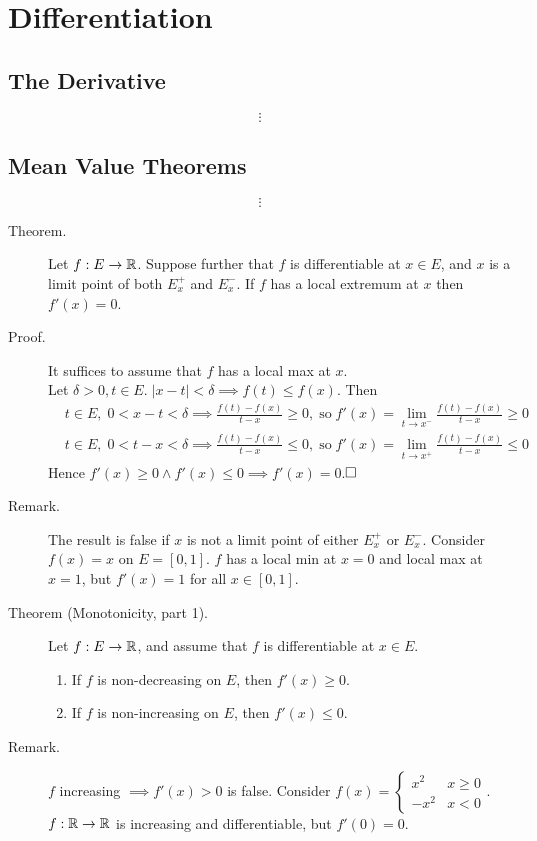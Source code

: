 \documentclass[letterpaper,11pt]{article}
\begin{document}
\section{Differentiation}
\subsection{The Derivative}
\[
\vdots
\]

\subsection{Mean Value Theorems}
\[
\vdots
\]
\begin{description}
\item[Theorem.] Let $f:E\to\mathbb{R}$. Suppose further that
    $f$ is differentiable at $x\in E$,
    and $x$ is a limit point of both $E_x^+$ and $E_x^-$.
    If $f$ has a local extremum at $x$ then $f'(x)=0$.

\item[Proof.] It suffices to assume that $f$ has a local max at $x$.\\
    Let $\delta>0,t\in E.\; |x-t|<\delta\implies f(t)\le f(x)$. Then
    \begin{align*}
    &t\in E,\;0<x-t<\delta\implies\frac{f(t)-f(x)}{t-x}\ge0,\;\text{so}\;
      f'(x)=\lim_{t\to x^-}\frac{f(t)-f(x)}{t-x}\ge 0\\
    &t\in E,\;0<t-x<\delta\implies\frac{f(t)-f(x)}{t-x}\le0,\;\text{so}\;
      f'(x)=\lim_{t\to x^+}\frac{f(t)-f(x)}{t-x}\le0
    \end{align*}
    Hence $f'(x)\ge0\wedge f'(x)\le0\implies f'(x)=0$.$\hfill\square$

\item[Remark.] The result is false if $x$ is not a limit point of
    either $E_x^+$ or $E_x^-$. Consider $f(x)=x$ on $E=[0,1]$.
    $f$ has a local min at $x=0$ and local max at $x=1$, but
    $f'(x)=1$ for all $x\in[0,1]$.

\item[Theorem (Monotonicity, part 1).] Let $f:E\to\mathbb{R}$, and assume
    that $f$ is differentiable at $x\in E$.
    \begin{enumerate}[1)]
    \item If $f$ is non-decreasing on $E$, then $f'(x)\ge0$.
    \item If $f$ is non-increasing on $E$, then $f'(x)\le0$.
    \end{enumerate}

\item[Remark.] $f$ increasing $\implies f'(x)>0$ is false.
    Consider $f(x)=\begin{cases}
      x^2 & x\ge0\\
      -x^2 & x<0
    \end{cases}$.\\
    $f:\mathbb{R}\to\mathbb{R}$ is increasing and differentiable, but $f'(0)=0$.


\end{description}
\end{document}
